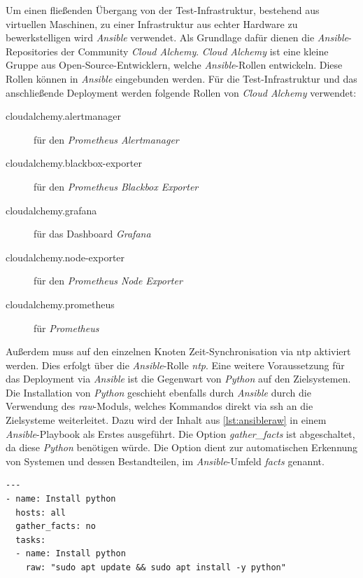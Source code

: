 \documentclass[titlepage]{report}
\begin{document}
Um einen fließenden Übergang von der Test\hyp{}Infrastruktur, bestehend
aus virtuellen Maschinen, zu einer Infrastruktur aus echter Hardware zu
bewerkstelligen wird \emph{Ansible} verwendet. Als Grundlage dafür
dienen die \emph{Ansible}\hyp{}Repositories der Community \emph{Cloud
Alchemy}. \emph{Cloud Alchemy} ist eine kleine Gruppe aus
Open\hyp{}Source\hyp{}Entwicklern, welche \emph{Ansible}\hyp{}Rollen
entwickeln. Diese Rollen können in \emph{Ansible} eingebunden
werden. Für die Test\hyp{}Infrastruktur und das anschließende
Deployment werden folgende Rollen von \emph{Cloud Alchemy} verwendet:
\begin{description}
    \item[cloudalchemy.alertmanager] für den \emph{Prometheus Alertmanager}
    \item[cloudalchemy.blackbox-exporter] für den \emph{Prometheus Blackbox Exporter}
    \item[cloudalchemy.grafana] für das Dashboard \emph{Grafana}
    \item[cloudalchemy.node-exporter] für den \emph{Prometheus Node Exporter}
    \item[cloudalchemy.prometheus] für \emph{Prometheus}
\end{description}
Außerdem muss auf den einzelnen Knoten Zeit\hyp{}Synchronisation via \gls{ntp} aktiviert werden.
Dies erfolgt über die \emph{Ansible}\hyp{}Rolle \emph{ntp}. Eine weitere
Voraussetzung für das Deployment via \emph{Ansible} ist die Gegenwart
von \emph{Python} auf den Zielsystemen. Die Installation von
\emph{Python} geschieht ebenfalls durch \emph{Ansible} durch die
Verwendung des \emph{raw}\hyp{}Moduls, welches Kommandos direkt via
\gls{ssh} an die Zielsysteme weiterleitet. Dazu wird der Inhalt aus
\autoref{lst:ansibleraw} in einem \emph{Ansible}\hyp{Playbook} als
Erstes ausgeführt. Die Option \emph{gather\_facts} ist abgeschaltet, da
diese \emph{Python} benötigen würde. Die Option dient zur automatischen
Erkennung von Systemen und dessen Bestandteilen, im
\emph{Ansible}\hyp{}Umfeld \emph{facts} genannt.

\begin{minipage}{\linewidth}
\begin{lstlisting}[caption={Installation von Python via Ansible
raw-Modul},label={lst:ansibleraw}]
---
- name: Install python
  hosts: all
  gather_facts: no
  tasks:
  - name: Install python
    raw: "sudo apt update && sudo apt install -y python"
\end{lstlisting}
\end{minipage}
\end{document}
